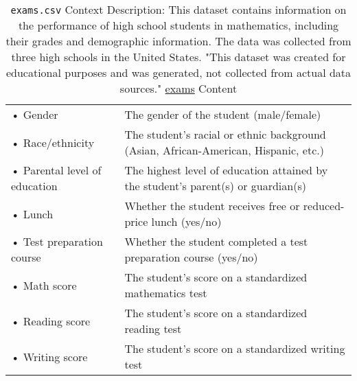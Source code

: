 \documentclass[12pt]{article}
\theoremstyle{remark}
\begin{document}
\begin{table}
	\caption{ \texttt{exams.csv}
Context
Description: This dataset contains information on the performance of high school students in mathematics, including their grades and demographic information. The data was collected from three high schools in the United States.
"This dataset was created for educational purposes and was generated, not collected from actual data sources."
\href{ https://www.kaggle.com/datasets/rkiattisak/student-performance-in-mathematics}{exams} Content
}
	\begin{tabular}{l|l}\hline
• Gender & The gender of the student (male/female)\\
• Race/ethnicity & The student's racial or ethnic background (Asian, African-American, Hispanic, etc.)\\
• Parental level of education & The highest level of education attained by the student's parent(s) or guardian(s)\\
• Lunch & Whether the student receives free or reduced-price lunch (yes/no)\\
• Test preparation course & Whether the student completed a test preparation course (yes/no)\\
• Math score & The student's score on a standardized mathematics test\\
• Reading score & The student's score on a standardized reading test\\
• Writing score & The student's score on a standardized writing test\\
	\hline
	\end{tabular}
\end{table}
%
\end{document}
